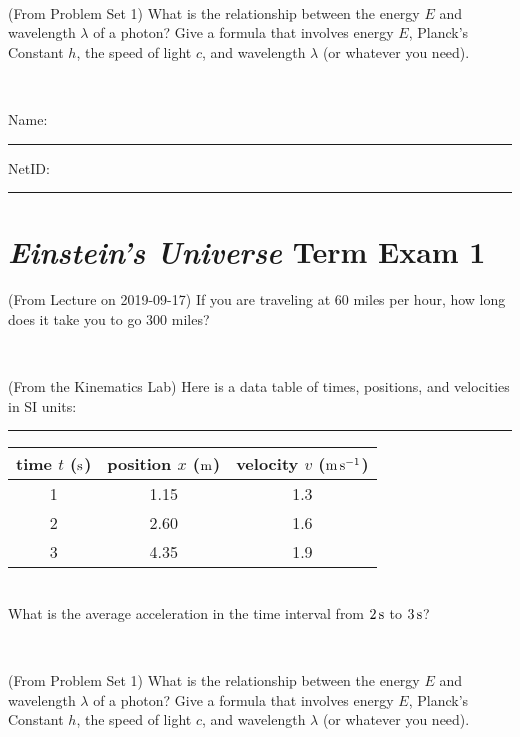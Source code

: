 \documentclass[12pt, letterpaper]{article}
\begin{document}
\vfill ~

\begin{problem} (From Problem Set 1)
What is the relationship between the energy $E$ and wavelength
$\lambda$ of a photon? Give a formula that involves energy $E$,
Planck's Constant $h$, the speed of light $c$, and wavelength
$\lambda$ (or whatever you need).
\end{problem}

\vfill ~


\cleardoublepage



\noindent
Name: \rule[-1ex]{0.60\textwidth}{0.1pt}
NetID: \rule[-1ex]{0.20\textwidth}{0.1pt}

\section*{\textsl{Einstein's Universe} Term Exam 1}
\setcounter{problem}{1}


\begin{problem} (From Lecture on 2019-09-17)
If you are traveling at 60 miles per hour, how long does
it take you to go 300 miles?
\end{problem}


\vfill ~

\begin{problem} (From the Kinematics Lab)
Here is a data table of times, positions, and velocities in SI units:\\
\rule{1.0in}{0pt}\begin{tabular}{c|c|c}
time $t$ ($\mathrm{s}$) & position $x$ ($\mathrm{m}$) & velocity $v$ ($\mathrm{m}\,\mathrm{s}^{-1}$) \\
\hline
1 & 1.15 & 1.3 \\
2 & 2.60 & 1.6 \\
3 & 4.35 & 1.9 \\
\hline
\end{tabular}\\
What is the average acceleration in the time interval from $2\,\mathrm{s}$ to $3\,\mathrm{s}$?
\end{problem}


\vfill ~

\begin{problem} (From Problem Set 1)
What is the relationship between the energy $E$ and wavelength
$\lambda$ of a photon? Give a formula that involves energy $E$,
Planck's Constant $h$, the speed of light $c$, and wavelength
$\lambda$ (or whatever you need).
\end{problem}
\end{document}
